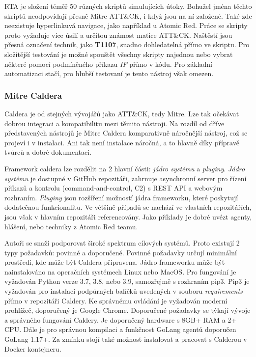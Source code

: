 \ac{RTA} je složení téměř 50 různých skriptů simulujících útoky.
Bohužel jména těchto skriptů neodpovídají přesně Mitre ATT\&CK, i když jsou na ní založené.
Také zde neexistuje hyperlinkuvá navigace, jako například u Atomic Red.
Práce se skripty proto vyžaduje více úsilí a určitou známost matice ATT\&CK\@.
Naštěstí jsou přesná označení technik, jako \textbf{T1107}, snadno dohledatelná přímo ve skriptu.
Pro složitější testování je možné spouštět všechny skripty najednou nebo vybrat některé pomocí podmíněného příkazu \textit{IF} přímo v kódu.
Pro základní automatizaci stačí, pro hlubší testovaní je tento nástroj však omezen.\cite{csoonline_4_testing_frameworks}


\subsubsection{Mitre Caldera}
Caldera je od stejných vývojářů jako ATT\&CK, tedy Mitre.
Lze tak očekávat dobrou integraci a kompatibilitu mezi těmito nástroji.
Na rozdíl od dříve představených nástrojů je Mitre Caldera komparativně náročnější nástroj, což se projeví i v instalaci.
Ani tak není instalace náročná, a to hlavně díky přípravě tvůrců a dobré dokumentaci\cite{mitre_caldera_docs}.

Framework caldera lze rozdělit na 2 hlavní části: \textit{jádro systému} a \textit{pluginy}.
\textit{Jádro systému} je dostupné v GitHub repozitáři, zahrnuje asynchronní server pro řízení příkazů a kontrolu (command-and-control, C2) s REST API a webovým rozhraním.
\textit{Pluginy} jsou rozšíření možností jádra frameworku, které poskytují dodatečnou funkcionalitu.
Ve většině případů se nachází ve vlastních repozitářích, jsou však v hlavním repozitáři referencovány.
Jako příklady je dobré uvézt agenty, hlášení, nebo techniky z Atomic Red teamu.\cite{mitre_caldera}

Autoři se snaží podporovat široké spektrum cílových systémů.
Proto existují 2 typy požadavků: povinné a doporučené.
Povinné požadavky určují minimální prostředí, kde může být Caldera připravena.
Jádro frameworku může být nainstalováno na operačních systémech Linux nebo MacOS\@.
Pro fungování je vyžadován Python verze 3.7, 3.8, nebo 3.9, samozřejmě s rozhraním pip3.
Pip3 je vyžadován pro instalaci podpůrných balíčků uvedených v souboru \textit{requirements} přímo v repozitáři Caldery.
Ke správnému ovládání je vyžadován moderní prohlížeč, doporučený je Google Chrome.
Doporučené požadavky se týkají vývoje a správného fungování Caldery.
Je doporučený hardware s 8GB+ RAM a 2+ CPU\@.
Dále je pro správnou kompilaci a funkčnost GoLang agentů doporučen GoLang 1.17+.
Za zmínku stojí také možnost instalovat a pracovat s Calderou v Docker kontejneru.\cite{mitre_caldera_docs}


